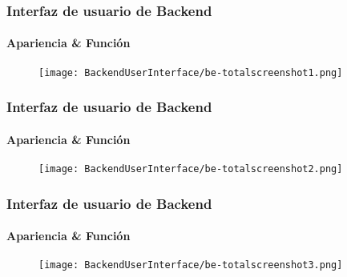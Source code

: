 
\begin{frame}[fragile]
	\frametitle{Interfaz de usuario de Backend}
	\framesubtitle{Apariencia \& Función}

	\begin{figure}
		\texttt{[image: BackendUserInterface/be-totalscreenshot1.png]}
	\end{figure}

\end{frame}


\begin{frame}[fragile]
	\frametitle{Interfaz de usuario de Backend}
	\framesubtitle{Apariencia \& Función}

	\begin{figure}
		\texttt{[image: BackendUserInterface/be-totalscreenshot2.png]}
	\end{figure}

\end{frame}


\begin{frame}[fragile]
	\frametitle{Interfaz de usuario de Backend}
	\framesubtitle{Apariencia \& Función}

	\begin{figure}
		\texttt{[image: BackendUserInterface/be-totalscreenshot3.png]}
	\end{figure}

\end{frame}

